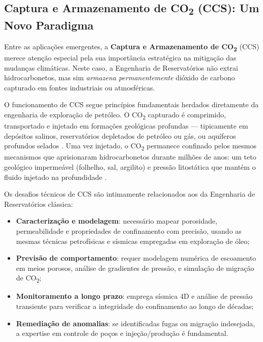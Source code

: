 \documentclass[
  12pt,
  a4paper,
  oneside,
  brazilian,
  sumario=tradicional
]{abntex2}
\begin{document}
\subsection{Captura e Armazenamento de CO\textsubscript{2} (CCS): Um Novo Paradigma}

Entre as aplicações emergentes, a \textbf{Captura e Armazenamento de
CO\textsubscript{2}} (CCS) merece atenção especial pela sua importância
estratégica na mitigação das mudanças climáticas. Neste caso, a
Engenharia de Reservatórios não extrai hidrocarbonetos, mas sim
\textit{armazena permanentemente} dióxido de carbono capturado em
fontes industriais ou atmosféricas.

O funcionamento de CCS segue princípios fundamentais herdados diretamente
da engenharia de exploração de petróleo. O CO\textsubscript{2} capturado
é comprimido, transportado e injetado em formações geológicas profundas
— tipicamente em depósitos salinos, reservatórios depletados de petróleo
ou gás, ou aquíferos profundos selados \cite{bachu2000}. Uma vez injetado,
o CO\textsubscript{2} permanece confinado pelos mesmos mecanismos que
aprisionaram hidrocarbonetos durante milhões de anos: um teto geológico
impermeável (folhelho, sal, argilito) e pressão litostática que mantém
o fluido injetado na profundidade \cite{ahmed2010}.

Os desafios técnicos de CCS são intimamente relacionados aos da
Engenharia de Reservatórios clássica:

\begin{itemize}
  \item \textbf{Caracterização e modelagem}: necessário mapear porosidade,
    permeabilidade e propriedades de confinamento com precisão, usando as
    mesmas técnicas petrofísicas e sísmicas empregadas em exploração de óleo;
  \item \textbf{Previsão de comportamento}: requer modelagem numérica de
    escoamento em meios porosos, análise de gradientes de pressão, e
    simulação de migração de CO\textsubscript{2};
  \item \textbf{Monitoramento a longo prazo}: emprega sísmica 4D e análise
    de pressão transiente para verificar a integridade do confinamento ao
    longo de décadas;
  \item \textbf{Remediação de anomalias}: se identificadas fugas ou migração
    indesejada, a expertise em controle de poços e injeção/produção é
    fundamental.
\end{itemize}
\end{document}
